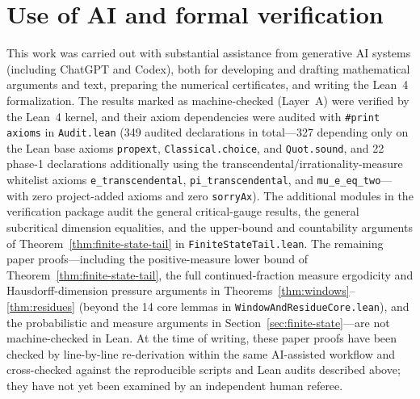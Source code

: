\documentclass[11pt]{article}
\theoremstyle{definition}
\theoremstyle{remark}
\begin{document}
\section*{Use of AI and formal verification}
This work was carried out with substantial assistance from generative AI
systems (including ChatGPT and Codex), both for developing and drafting
mathematical arguments and text, preparing the numerical certificates, and
writing the Lean~4 formalization. The results marked as machine-checked (Layer~A)
were verified by the Lean~4 kernel, and their axiom dependencies were audited
with \texttt{\#print axioms} in \texttt{Audit.lean} (349 audited declarations
in total---327 depending only on the Lean base axioms \texttt{propext},
\texttt{Classical.choice}, and \texttt{Quot.sound}, and 22 phase-1 declarations
additionally using the transcendental/irrationality-measure whitelist axioms
\texttt{e\_transcendental}, \texttt{pi\_transcendental}, and
\texttt{mu\_e\_eq\_two}---with zero project-added axioms and zero
\texttt{sorryAx}). The additional modules in the verification package audit the general
critical-gauge results, the general subcritical dimension equalities,
and the upper-bound and countability arguments of
Theorem~\ref{thm:finite-state-tail} in \texttt{FiniteStateTail.lean}.
The remaining paper proofs---including the positive-measure lower bound of
Theorem~\ref{thm:finite-state-tail}, the full continued-fraction measure
ergodicity and Hausdorff-dimension pressure arguments in
Theorems~\ref{thm:windows}--\ref{thm:residues} (beyond the 14 core lemmas in
\texttt{WindowAndResidueCore.lean}), and the probabilistic and measure
arguments in Section~\ref{sec:finite-state}---are not machine-checked in Lean.
At the time of writing, these paper proofs have been checked by
line-by-line re-derivation within the same AI-assisted workflow and
cross-checked against the reproducible scripts and Lean audits described
above; they have not yet been examined by an independent human referee.
\end{document}

